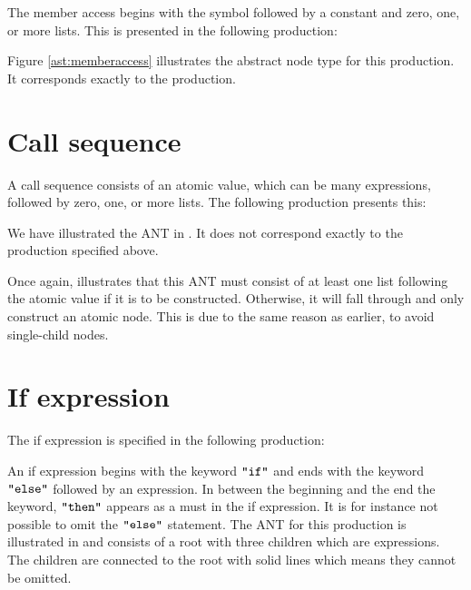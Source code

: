 The member access begins with the  symbol followed by a constant and
zero, one, or more lists. This is presented in the following production:

\begin{ebnf}
\end{ebnf}

Figure \ref{ast:memberaccess} illustrates the abstract node type for this
production. It corresponds exactly to the production.



\section{Call sequence}

A call sequence consists of an atomic value, which can be many expressions,
followed by zero, one, or more lists. The following production presents this:

\begin{ebnf}
\end{ebnf}

We have illustrated the ANT in . It does not correspond
exactly to the production specified above.




Once again,  illustrates that this ANT must consist of
at least one list following the atomic value if it is to be constructed.
Otherwise, it will fall through and only construct an atomic node. This is due
to the same reason as earlier, to avoid single-child nodes.

\section{If expression}
The if expression is specified in the following production:

\begin{ebnf}
\end{ebnf}

An if expression begins with the keyword $\texttt{"if"}$ and ends with the keyword
$\texttt{"else"}$ followed by an expression. In between the beginning and the end the
keyword, $\texttt{"then"}$ appears as a must in the if expression. It is for instance not
possible to omit the $\texttt{"else"}$ statement. The ANT for this production is
illustrated in  and consists of a root with three children
which are expressions. The children are connected to the root with solid lines
which means they cannot be omitted.

